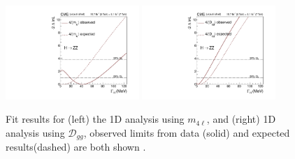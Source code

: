 \begin{figure}
\begin{center}
\caption[Fit results for (left) the 1D analysis using $m_{4\ell}$, and (right) 1D analysis using $\mathcal{D}_{gg}$, observed limits from data (solid) and expected results(dashed) are both shown.]{Fit results for (left) the 1D analysis using $m_{4\ell}$, and (right) 1D analysis using $\mathcal{D}_{gg}$, observed limits from data (solid) and expected results(dashed) are both shown \cite{Khachatryan:2014iha}.
\label{fig:1D_width}}
\includegraphics[width=0.45\textwidth]{HZZ_Width/1Dm4lFitPaper_30_04_14_MeV.pdf}
\includegraphics[width=0.45\textwidth]{HZZ_Width/1DDggFitPaper_30_04_14_MeV.pdf}
\end{center}
\end{figure}

